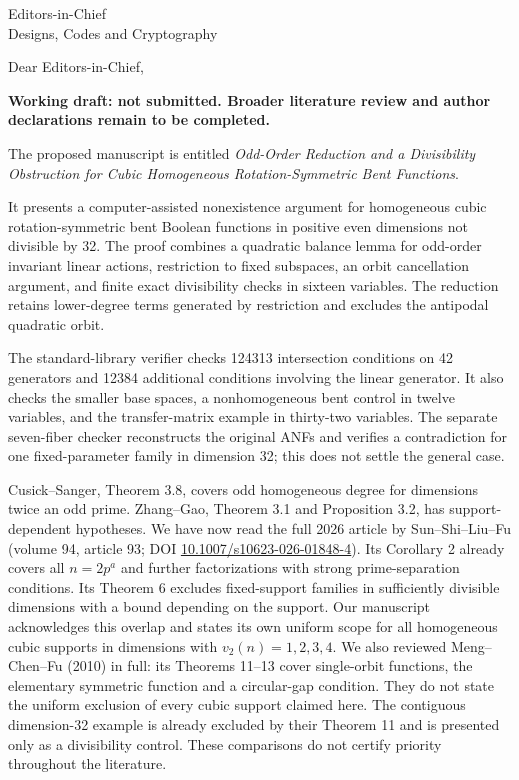 \documentclass[11pt]{letter}
\begin{document}
\begin{letter}{Editors-in-Chief\\Designs, Codes and Cryptography}
\opening{Dear Editors-in-Chief,}
\textbf{Working draft: not submitted. Broader literature review and author declarations remain to be completed.}

The proposed manuscript is entitled \emph{Odd-Order Reduction and a Divisibility Obstruction for Cubic Homogeneous Rotation-Symmetric Bent Functions}.

It presents a computer-assisted nonexistence argument for homogeneous cubic rotation-symmetric bent Boolean functions in positive even dimensions not divisible by 32. The proof combines a quadratic balance lemma for odd-order invariant linear actions, restriction to fixed subspaces, an orbit cancellation argument, and finite exact divisibility checks in sixteen variables. The reduction retains lower-degree terms generated by restriction and excludes the antipodal quadratic orbit.

The standard-library verifier checks 124313 intersection conditions on 42 generators and 12384 additional conditions involving the linear generator. It also checks the smaller base spaces, a nonhomogeneous bent control in twelve variables, and the transfer-matrix example in thirty-two variables. The separate seven-fiber checker reconstructs the original ANFs and verifies a contradiction for one fixed-parameter family in dimension 32; this does not settle the general case.

Cusick--Sanger, Theorem 3.8, covers odd homogeneous degree for dimensions twice an odd prime. Zhang--Gao, Theorem 3.1 and Proposition 3.2, has support-dependent hypotheses. We have now read the full 2026 article by Sun--Shi--Liu--Fu (volume 94, article 93; DOI \url{10.1007/s10623-026-01848-4}). Its Corollary 2 already covers all $n=2p^a$ and further factorizations with strong prime-separation conditions. Its Theorem 6 excludes fixed-support families in sufficiently divisible dimensions with a bound depending on the support. Our manuscript acknowledges this overlap and states its own uniform scope for all homogeneous cubic supports in dimensions with $v_2(n)=1,2,3,4$. We also reviewed Meng--Chen--Fu (2010) in full: its Theorems 11--13 cover single-orbit functions, the elementary symmetric function and a circular-gap condition. They do not state the uniform exclusion of every cubic support claimed here. The contiguous dimension-32 example is already excluded by their Theorem 11 and is presented only as a divisibility control. These comparisons do not certify priority throughout the literature.


\end{letter}
\end{document}
